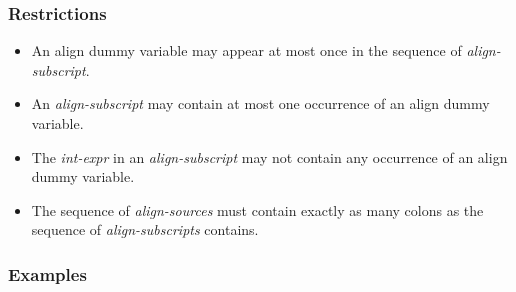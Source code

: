 \subsubsection*{Restrictions}

\begin{itemize}
\item An align dummy variable may appear at most once in the sequence of
      {\it align-subscript}.
\item An {\it align-subscript} may contain at most one occurrence of an
      align dummy variable.
\item The {\it int-expr} in an {\it align-subscript} may not contain any
      occurrence of an align dummy variable.
\item The sequence of {\it align-sources} must contain exactly as many
      colons as the sequence of {\it align-subscripts} contains.

\end{itemize}

\subsubsection*{Examples}

